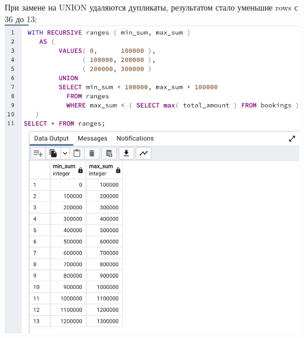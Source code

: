 \documentclass[a4paper,12pt]{article}
\begin{document}
\\\\
При замене на UNION удаляются дупликаты, результатом стало уменьшие rows с 36 до 13:
\\
\includegraphics[scale=0.6]{192.png}
\clearpage
\end{document}
